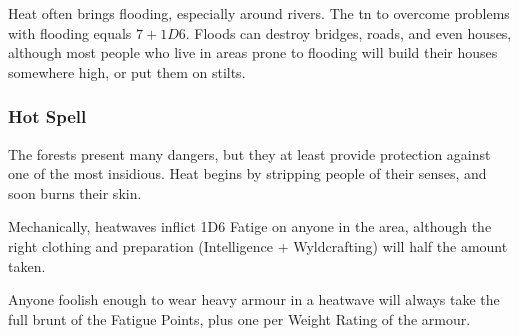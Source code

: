 \begin{multicols}{2}
Heat often brings flooding, especially around rivers.
The \gls{tn} to overcome problems with flooding equals $7 + 1D6$.
Floods can destroy bridges, roads, and even houses, although most people who live in areas prone to flooding will build their houses somewhere high, or put them on stilts.

\subsubsection{Hot Spell}

The forests present many dangers, but they at least provide protection against one of the most insidious.
Heat begins by stripping people of their senses, and soon burns their skin.

Mechanically, heatwaves inflict 1D6 Fatige on anyone in the area, although the right clothing and preparation (Intelligence + Wyldcrafting) will half the amount taken.

Anyone foolish enough to wear heavy armour in a heatwave will always take the full brunt of the Fatigue Points, plus one per Weight Rating of the armour.


\end{multicols}
